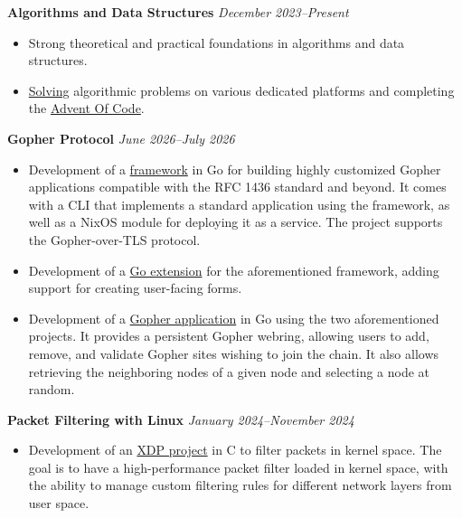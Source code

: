 \documentclass[margin,line]{../res}
\begin{document}
\begin{resume}
  {\bf Algorithms and Data Structures}
  \hfill {\it December 2023--Present}
  \vspace*{.05in}
  \begin{itemize}
    \item Strong theoretical and practical foundations in algorithms
      and data structures.
    \item \href{https://leetcode.com/u/theobori/}{Solving} algorithmic
      problems on various dedicated platforms and completing the
      \href{https://github.com/theobori/advent-of-code}{Advent Of Code}.
  \end{itemize}

  {\bf Gopher Protocol}
  \hfill {\it June 2026--July 2026}
  \vspace*{.05in}
  \begin{itemize}
    \item Development of a
      \href{https://github.com/theobori/fleur}{framework} in Go
      for building highly customized Gopher applications compatible
      with the RFC 1436 standard and beyond. It comes with a CLI that
      implements a standard application using the framework, as well
      as a NixOS module for deploying it as a service. The project
      supports the Gopher-over-TLS protocol.
    \item Development of a
      \href{https://github.com/theobori/fleur-form}{Go extension}
      for the aforementioned framework, adding support for creating
      user-facing forms.
    \item Development of a
      \href{https://github.com/theobori/ange}{Gopher application} in
      Go using the two aforementioned projects. It provides a
      persistent Gopher webring, allowing users to add, remove, and
      validate Gopher sites wishing to join the chain. It also allows
      retrieving the neighboring nodes of a given node and selecting
      a node at random.
  \end{itemize}

  {\bf Packet Filtering with Linux}
  \hfill {\it January 2024--November 2024}
  \vspace*{.05in}
  \begin{itemize}
    \item Development of an
      \href{https://github.com/theobori/tinyfilter}{XDP project} in C to
      filter packets in kernel space. The goal is to have a
      high-performance packet filter loaded in kernel space, with the
      ability to manage custom filtering rules for different network
      layers from user space.
  \end{itemize}


\end{resume}
\end{document}
